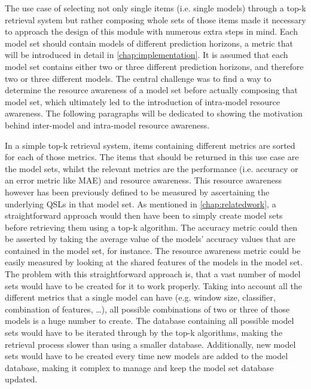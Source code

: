 
The use case of selecting not only single items (i.e. single models) through a top-k retrieval system but rather composing whole sets of those items made it necessary to approach the design of this module with numerous extra steps in mind. Each model set should contain models of different prediction horizons, a metric that will be introduced in detail in \autoref{chap:implementation}. It is assumed that each model set contains either two or three different prediction horizons, and therefore two or three different models. The central challenge was to find a way to determine the resource awareness of a model set before actually composing that model set, which ultimately led to the introduction of intra-model resource awareness. The following paragraphs will be dedicated to showing the motivation behind inter-model and intra-model resource awareness. 

In a simple top-k retrieval system, items containing different metrics are sorted for each of those metrics. The items that should be returned in this use case are the model sets, whilst the relevant metrics are the performance (i.e. accuracy or an error metric like MAE) and resource awareness. This resource awareness however has been previously defined to be measured by ascertaining the underlying QSLs in that model set. As mentioned in \autoref{chap:relatedwork}, a straightforward approach would then have been to simply create model sets before retrieving them using a top-k algorithm. The accuracy metric could then be asserted by taking the average value of the models' accuracy values that are contained in the model set, for instance. The resource awareness metric could be easily measured by looking at the shared features of the models in the model set. The problem with this straightforward approach is, that a vast number of model sets would have to be created for it to work properly. Taking into account all the different metrics that a single model can have (e.g. window size, classifier, combination of features, …), all possible combinations of two or three of those models is a huge number to create. The database containing all possible model sets would have to be iterated through by the top-k algorithms, making the retrieval process slower than using a smaller database. Additionally, new model sets would have to be created every time new models are added to the model database, making it complex to manage and keep the model set database updated. 

